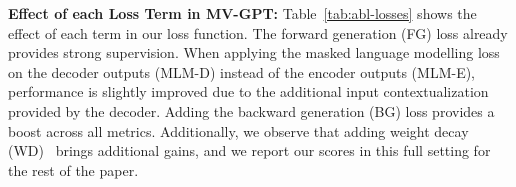 \documentclass[10pt,twocolumn,letterpaper]{article}
\begin{document}
\begin{table}[t]
    \centering
    \caption{Ablation on YouCook2 showing the effect of our different loss components in pretraining. \textbf{FG:} Forward Generation loss. \textbf{BG:} Backward Generation loss. \textbf{MLM-E/MLM-D:} Masked Language Modelling loss applied on encoder outputs (E) or decoder outputs (D). \textbf{WD:} Weight Decay. \textbf{No PT:} No pretraining with any of these losses.
    } 
    \label{tab:abl-losses}
\end{table}
\noindent\textbf{Effect of each Loss Term in MV-GPT:}
Table~\ref{tab:abl-losses} shows the effect of each term in our loss function. 
The forward generation (FG) loss already provides strong supervision.
When applying the masked language modelling loss on the decoder outputs (MLM-D) instead of the encoder outputs (MLM-E), performance is slightly improved due to the additional input contextualization provided by the decoder.
Adding the backward generation (BG) loss provides a boost across all metrics.  
Additionally, we observe that adding weight decay (WD)~\cite{krogh1992simple} brings additional gains, and we report our scores in this full setting for the rest of the paper.
\end{document}
